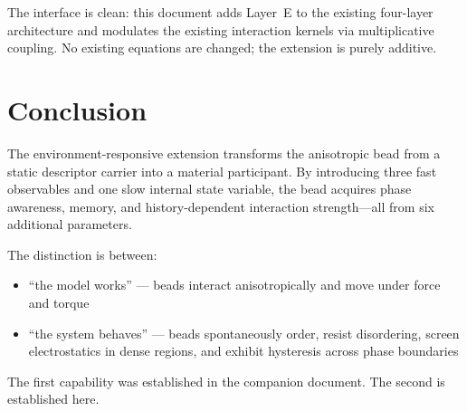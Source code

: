 \documentclass[11pt]{article}
\begin{document}
The interface is clean: this document adds Layer~E to the existing
four-layer architecture and modulates the existing interaction kernels via
multiplicative coupling.  No existing equations are changed; the extension
is purely additive.

\section{Conclusion}

The environment-responsive extension transforms the anisotropic bead from a
static descriptor carrier into a material participant.  By introducing three
fast observables and one slow internal state variable, the bead acquires
phase awareness, memory, and history-dependent interaction strength---all
from six additional parameters.

The distinction is between:
\begin{itemize}
    \item ``the model works'' --- beads interact anisotropically and move
          under force and torque
    \item ``the system behaves'' --- beads spontaneously order, resist
          disordering, screen electrostatics in dense regions, and exhibit
          hysteresis across phase boundaries
\end{itemize}

The first capability was established in the companion document.  The second
is established here.
\end{document}
